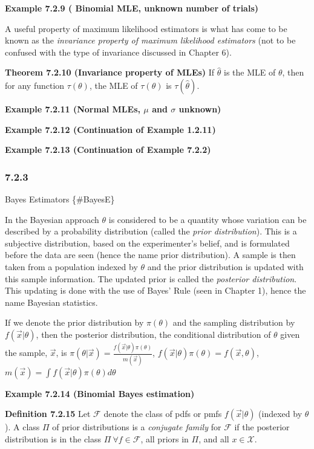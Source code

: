 \documentclass[10pt,twocolumn,portrait]{article}
\begin{document}
\textbf{Example 7.2.9 ( Binomial MLE, unknown number of trials)}

A useful property of maximum likelihood estimators is what has come to
be known as the \emph{invariance property of maximum likelihood
estimators} (not to be confused with the type of invariance discussed in
Chapter 6).

\textbf{Theorem 7.2.10 (Invariance property of MLEs)} If \(\hat\theta\)
is the MLE of \(\theta\), then for any function \(\tau(\theta)\), the
MLE of \(\tau(\theta)\) is \(\tau(\hat\theta)\).

\textbf{Example 7.2.11 (Normal MLEs, \(\mu\) and \(\sigma\) unknown)}

\textbf{Example 7.2.12 (Continuation of Example 1.2.11)}

\textbf{Example 7.2.13 (Continuation of Example 7.2.2)}

\hypertarget{section-3}{%
\subsubsection{7.2.3}\label{section-3}}

Bayes Estimators \{\#BayesE\}

In the Bayesian approach \(\theta\) is considered to be a quantity whose
variation can be described by a probability distribution (called the
\emph{prior distribution}). This is a subjective distribution, based on
the experimenter's belief, and is formulated before the data are seen
(hence the name prior distribution). A sample is then taken from a
population indexed by \(\theta\) and the prior distribution is updated
with this sample information. The updated prior is called the
\emph{posterior distribution}. This updating is done with the use of
Bayes' Rule (seen in Chapter 1), hence the name Bayesian statistics.

If we denote the prior distribution by \(\pi(\theta)\) and the sampling
distribution by \(f(\vec x|\theta)\), then the posterior distribution,
the conditional distribution of \(\theta\) given the sample, \(\vec x\),
is \(\pi(\theta|\vec x)=\frac{f(\vec x|\theta)\pi(\theta)}{m(\vec x)}\),
\(f(\vec x|\theta)\pi(\theta)=f(\vec x,\theta)\),
\(m(\vec x)=\int f(\vec x|\theta)\pi(\theta)d\theta\)

\textbf{Example 7.2.14 (Binomial Bayes estimation)}

\textbf{Definition 7.2.15} Let \(\mathcal{F}\) denote the class of pdfs
or pmfs \(f(\vec x|\theta)\) (indexed by \(\theta\)). A class \(\Pi\) of
prior distributions is a \emph{conjugate family} for \(\mathcal{F}\) if
the posterior distribution is in the class
\(\Pi\ \forall f\in\mathcal{F}\), all priors in \(\Pi\), and all
\(x\in\mathcal{X}\).
\end{document}
